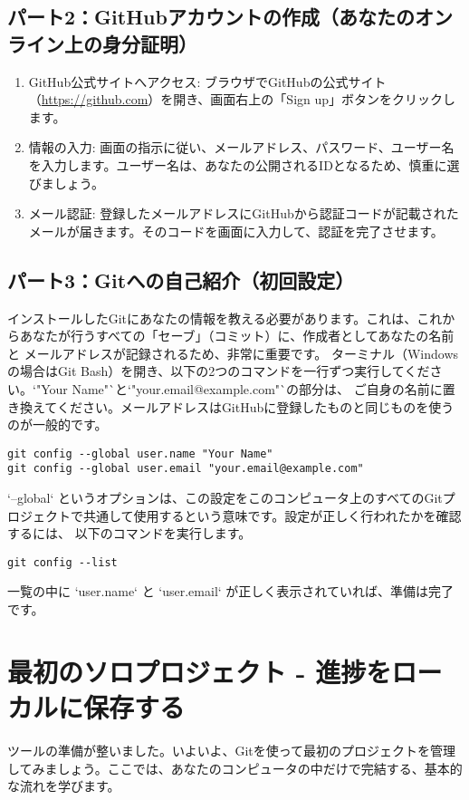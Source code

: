 \documentclass{ltjsarticle}
\begin{document}
\subsection{パート2：GitHubアカウントの作成（あなたのオンライン上の身分証明）}
\begin{enumerate}
    \item GitHub公式サイトへアクセス: ブラウザでGitHubの公式サイト（\url{https://github.com}）を開き、画面右上の「Sign up」ボタンをクリックします。
    \item 情報の入力: 画面の指示に従い、メールアドレス、パスワード、ユーザー名を入力します。ユーザー名は、あなたの公開されるIDとなるため、慎重に選びましょう。
    \item メール認証: 登録したメールアドレスにGitHubから認証コードが記載されたメールが届きます。そのコードを画面に入力して、認証を完了させます。
\end{enumerate}

\subsection{パート3：Gitへの自己紹介（初回設定）}
インストールしたGitにあなたの情報を教える必要があります。これは、これからあなたが行うすべての「セーブ」（コミット）に、作成者としてあなたの名前と
メールアドレスが記録されるため、非常に重要です。
ターミナル（Windowsの場合はGit Bash）を開き、以下の2つのコマンドを一行ずつ実行してください。`"Your Name"`と`"your.email@example.com"`の部分は、
ご自身の名前に置き換えてください。メールアドレスはGitHubに登録したものと同じものを使うのが一般的です。
\begin{verbatim}
git config --global user.name "Your Name"
git config --global user.email "your.email@example.com"
\end{verbatim}
`--global` というオプションは、この設定をこのコンピュータ上のすべてのGitプロジェクトで共通して使用するという意味です。設定が正しく行われたかを確認するには、
以下のコマンドを実行します。
\begin{verbatim}
git config --list
\end{verbatim}
一覧の中に `user.name` と `user.email` が正しく表示されていれば、準備は完了です。

\section{最初のソロプロジェクト - 進捗をローカルに保存する}
ツールの準備が整いました。いよいよ、Gitを使って最初のプロジェクトを管理してみましょう。ここでは、あなたのコンピュータの中だけで完結する、基本的な流れを学びます。
\end{document}
